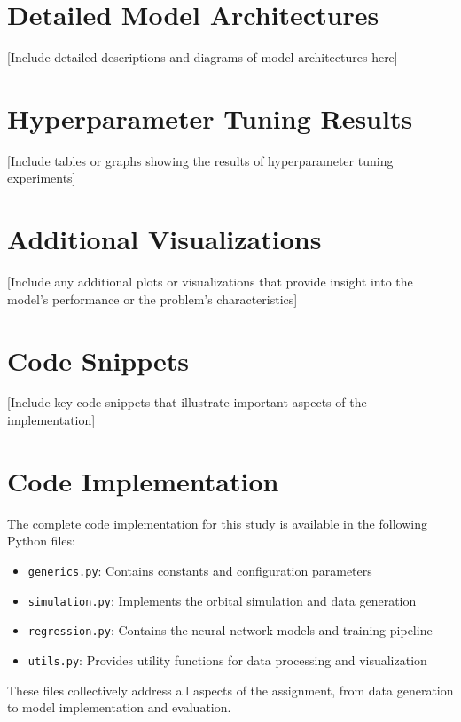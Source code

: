 \documentclass[12pt,a4paper]{article}
\begin{document}
\appendix

\section{Detailed Model Architectures}
\label{appendix:model_architectures}

[Include detailed descriptions and diagrams of model architectures here]

\section{Hyperparameter Tuning Results}
\label{appendix:hyperparameter_tuning}

[Include tables or graphs showing the results of hyperparameter tuning experiments]

\section{Additional Visualizations}
\label{appendix:additional_visualizations}

[Include any additional plots or visualizations that provide insight into the model's performance or the problem's characteristics]

\section{Code Snippets}
\label{appendix:code_snippets}

[Include key code snippets that illustrate important aspects of the implementation]
\section{Code Implementation}
\label{sec:appendix}
The complete code implementation for this study is available in the following Python files:

\begin{itemize}
    \item \texttt{generics.py}: Contains constants and configuration parameters
    \item \texttt{simulation.py}: Implements the orbital simulation and data generation
    \item \texttt{regression.py}: Contains the neural network models and training pipeline
    \item \texttt{utils.py}: Provides utility functions for data processing and visualization
\end{itemize}

These files collectively address all aspects of the assignment, from data generation to model implementation and evaluation.
\end{document}
